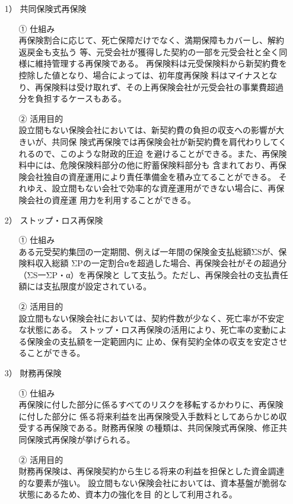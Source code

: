 \documentclass[report,gutter=10mm,fore-edge=10mm,uplatex,dvipdfmx]{jlreq}
\begin{document}
\answer{}
\begin{itemize}
\item[1）] 共同保険式再保険
\begin{itemize}
\item[①] 仕組み\\
再保険割合に応じて、死亡保障だけでなく、満期保障もカバーし、解約返戻金も支払う
等、元受会社が獲得した契約の一部を元受会社と全く同様に維持管理する再保険である。
再保険料は元受保険料から新契約費を控除した値となり、場合によっては、初年度再保険
料はマイナスとなり、再保険料は受け取れず、その上再保険会社が元受会社の事業費超過
分を負担するケースもある。
\item[②] 活用目的\\
設立間もない保険会社においては、新契約費の負担の収支への影響が大きいが、共同保
険式再保険では再保険会社が新契約費を肩代わりしてくれるので、このような財政的圧迫
を避けることができる。また、再保険料中には、危険保険料部分の他に貯蓄保険料部分も
含まれており、再保険会社独自の資産運用により責任準備金を積み立てることができる。
それゆえ、設立間もない会社で効率的な資産運用ができない場合に、再保険会社の資産運
用力を利用することができる。
\end{itemize}
\item[2）] ストップ・ロス再保険
\begin{itemize}
\item[①] 仕組み\\
ある元受契約集団の一定期間、例えば一年間の保険金支払総額ΣSが、保険料収入総額
ΣPの一定割合αを超過した場合、再保険会社がその超過分（ΣS一ΣP・α）を再保険と
して支払う。ただし、再保険会社の支払責任額には支払限度が設定されている。
\item[②] 活用目的\\
設立間もない保険会社においては、契約件数が少なく、死亡率が不安定な状態にある。
ストップ・ロス再保険の活用により、死亡率の変動による保険金の支払額を一定範囲内に
止め、保有契約全体の収支を安定させることができる。
\end{itemize}
\item[3）] 財務再保険
\begin{itemize}
\item[①] 仕組み\\
再保険に付した部分に係るすべてのリスクを移転するかわりに、再保険に付した部分に
係る将来利益を出再保険受入手数料としてあらかじめ収受する再保険である。財務再保険
の種類は、共同保険式再保険、修正共同保険式再保険が挙げられる。
\item[②] 活用目的\\
財務再保険は、再保険契約から生じる将来の利益を担保とした資金調達的な要素が強い。
設立間もない保険会社においては、資本基盤が脆弱な状態にあるため、資本力の強化を目
的として利用される。
\end{itemize}
\end{itemize}
\end{document}
